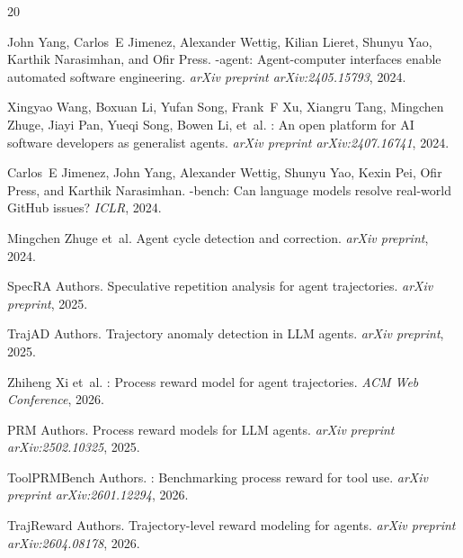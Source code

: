 \documentclass[11pt,a4paper]{article}
\begin{document}

\begin{thebibliography}{20}

John Yang, Carlos~E Jimenez, Alexander Wettig, Kilian Lieret, Shunyu Yao, Karthik Narasimhan, and Ofir Press.
-agent: Agent-computer interfaces enable automated software engineering.
\newblock \emph{arXiv preprint arXiv:2405.15793}, 2024.

Xingyao Wang, Boxuan Li, Yufan Song, Frank~F Xu, Xiangru Tang, Mingchen Zhuge, Jiayi Pan, Yueqi Song, Bowen Li, et~al.
: An open platform for {AI} software developers as generalist agents.
\newblock \emph{arXiv preprint arXiv:2407.16741}, 2024.

Carlos~E Jimenez, John Yang, Alexander Wettig, Shunyu Yao, Kexin Pei, Ofir Press, and Karthik Narasimhan.
-bench: Can language models resolve real-world {GitHub} issues?
\newblock \emph{ICLR}, 2024.

Mingchen Zhuge et~al.
\newblock Agent cycle detection and correction.
\newblock \emph{arXiv preprint}, 2024.

{SpecRA Authors}.
\newblock Speculative repetition analysis for agent trajectories.
\newblock \emph{arXiv preprint}, 2025.

{TrajAD Authors}.
\newblock Trajectory anomaly detection in {LLM} agents.
\newblock \emph{arXiv preprint}, 2025.

Zhiheng Xi et~al.
: Process reward model for agent trajectories.
\newblock \emph{ACM Web Conference}, 2026.

{PRM Authors}.
\newblock Process reward models for {LLM} agents.
\newblock \emph{arXiv preprint arXiv:2502.10325}, 2025.

{ToolPRMBench Authors}.
: Benchmarking process reward for tool use.
\newblock \emph{arXiv preprint arXiv:2601.12294}, 2026.

{TrajReward Authors}.
\newblock Trajectory-level reward modeling for agents.
\newblock \emph{arXiv preprint arXiv:2604.08178}, 2026.


\end{thebibliography}
\end{document}
